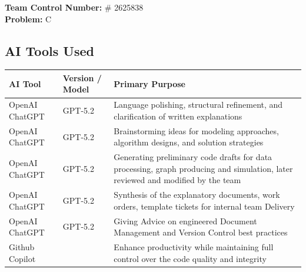\noindent\textbf{Team Control Number:} \# 2625838\\
\textbf{Problem:} C\\

\vspace{0.1em}
\subsection*{AI Tools Used}
\begin{table}[h!]
\centering
\small
\setlength{\tabcolsep}{6pt}
\renewcommand{\arraystretch}{1.15}
\begin{tabular}{|p{3.2cm}|p{3.2cm}|p{8.2cm}|}
\hline
\textbf{AI Tool} & \textbf{Version / Model} & \textbf{Primary Purpose} \\
\hline
OpenAI ChatGPT  & GPT-5.2 &
Language polishing, structural refinement, and clarification of written explanations \\
OpenAI ChatGPT & GPT-5.2 &
Brainstorming ideas for modeling approaches, algorithm designs, and solution strategies \\
OpenAI ChatGPT & GPT-5.2 &
Generating preliminary code drafts for data processing, graph producing and simulation, later reviewed and modified by the team \\
OpenAI ChatGPT & GPT-5.2 &
Synthesis of the explanatory documents, work orders, template tickets for internal team Delivery \\
OpenAI ChatGPT & GPT-5.2 &
Giving Advice on engineered Document Management and Version Control best practices \\
Github Copilot & \center{---} & Enhance productivity while maintaining full control over the code quality and integrity\\
\hline
\end{tabular}
\end{table}

